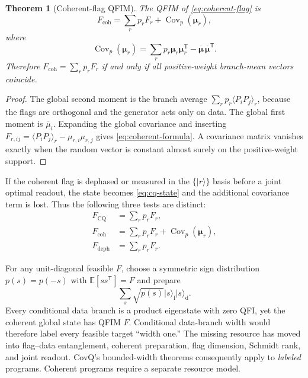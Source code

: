 \documentclass[11pt]{article}
\newtheorem{theorem}{Theorem}[section]
\theoremstyle{definition}
\theoremstyle{remark}
\newcommand{\Cov}{\operatorname{Cov}}
\newcommand{\cq}{\mathrm{CQ}}
\newcommand{\coh}{\mathrm{coh}}
\newcommand{\deph}{\mathrm{deph}}
\newcommand{\ket}[1]{\lvert #1\rangle}
\begin{document}
\begin{theorem}[Coherent-flag QFIM]
\label{thm:coherent-flag}
The QFIM of \cref{eq:coherent-flag} is
\begin{equation}
  F_{\coh}
  =\sum_rp_rF_r+\Cov_p(\bm\mu_r),
  \label{eq:coherent-formula}
\end{equation}
where
\begin{equation}
  \Cov_p(\bm\mu_r)
  =\sum_rp_r\bm\mu_r\bm\mu_r^{\mathsf T}
  -\overline{\bm\mu}\,\overline{\bm\mu}^{\mathsf T}.
\end{equation}
Therefore $F_{\coh}=\sum_rp_rF_r$ if and only if all positive-weight branch-mean vectors coincide.
\end{theorem}

\begin{proof}
The global second moment is the branch average $\sum_rp_r\langle P_iP_j\rangle_r$, because the flags are orthogonal and the generator acts only on data. The global first moment is $\overline\mu_i$. Expanding the global covariance and inserting $F_{r,ij}=\langle P_iP_j\rangle_r-\mu_{r,i}\mu_{r,j}$ gives \cref{eq:coherent-formula}. A covariance matrix vanishes exactly when the random vector is constant almost surely on the positive-weight support.
\end{proof}

If the coherent flag is dephased or measured in the $\{\ket r\}$ basis before a joint optimal readout, the state becomes \cref{eq:cq-state} and the additional covariance term is lost. Thus the following three tests are distinct:
\begin{equation}
\begin{aligned}
  F_{\cq}&=\sum_rp_rF_r,\\
  F_{\coh}&=\sum_rp_rF_r+\Cov_p(\bm\mu_r),\\
  F_{\deph}&=\sum_rp_rF_r.
\end{aligned}
\label{eq:three-flag-tests}
\end{equation}

\begin{warningbox}[title={Coherent-flag resource loophole}]
For any unit-diagonal feasible $F$, choose a symmetric sign distribution $p(s)=p(-s)$ with $\mathbb E[s s^{\mathsf T}]=F$ and prepare
\[
  \sum_s\sqrt{p(s)}\ket{s}_{\mathrm f}\ket{s}_{\mathrm d}.
\]
Every conditional data branch is a product eigenstate with zero QFI, yet the coherent global state has QFIM $F$. Conditional data-branch width would therefore label every feasible target ``width one.'' The missing resource has moved into flag--data entanglement, coherent preparation, flag dimension, Schmidt rank, and joint readout. CovQ's bounded-width theorems consequently apply to \emph{labeled} programs. Coherent programs require a separate resource model.
\end{warningbox}
\end{document}
